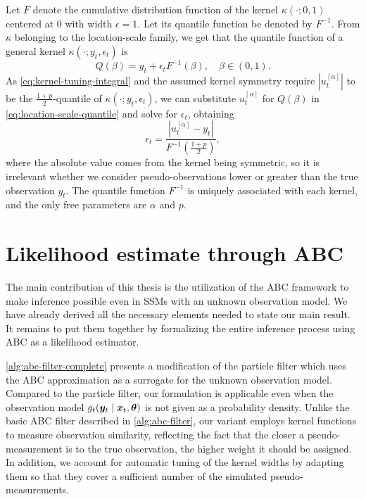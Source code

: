 Let $F$ denote the cumulative distribution function of the kernel $\kappa(\cdot; 0, 1)$ centered at 0 with width $\epsilon = 1$. Let its quantile function be denoted by $F^{-1}$. From $\kappa$ belonging to the location-scale family, we get that the quantile function of a general kernel $\kappa(\cdot; y_t, \epsilon_t)$ is
\begin{equation} \label{eq:location-scale-quantile}
Q(\beta) = y_t + \epsilon_t F^{-1}(\beta), \quad \beta \in \left(0, 1\right).
\end{equation}
As \eqref{eq:kernel-tuning-integral} and the assumed kernel symmetry require $\left| u_t^{[\alpha]} \right|$ to be the $\frac{1+p}{2}$-quantile of $\kappa(\cdot; y_t, \epsilon_t)$, we can substitute $u_t^{[\alpha]}$ for $Q(\beta)$ in \eqref{eq:location-scale-quantile} and solve for $\epsilon_t$, obtaining
\begin{equation} \label{eq:kernel-tuning}
\epsilon_t = \frac{\left| u_t^{[\alpha]} - y_t \right|}{F^{-1}(\frac{1+p}{2})},
\end{equation}
where the absolute value comes from the kernel being symmetric, so it is irrelevant whether we consider pseudo-observations lower or greater than the true observation $y_t$. The quantile function $F^{-1}$ is uniquely associated with each kernel, and the only free parameters are $\alpha$ and $p$.


\section{Likelihood estimate through ABC} \label{sec:abcmh}
The main contribution of this thesis is the utilization of the ABC framework to make inference possible even in SSMs with an unknown observation model. We have already derived all the necessary elements needed to state our main result. It remains to put them together by formalizing the entire inference process using ABC as a likelihood estimator.

\autoref{alg:abc-filter-complete} presents a modification of the particle filter which uses the ABC approximation as a surrogate for the unknown observation model. Compared to the particle filter, our formulation is applicable even when the observation model $g_t(\bm{y}_t \mid \bm{x}_t, \bm{\theta})$ is not given as a probability density. Unlike the basic ABC filter described in \autoref{alg:abc-filter}, our variant employs kernel functions to measure observation similarity, reflecting the fact that the closer a pseudo-measurement is to the true observation, the higher weight it should be assigned. In addition, we account for automatic tuning of the kernel widths by adapting them so that they cover a sufficient number of the simulated pseudo-measurements.


